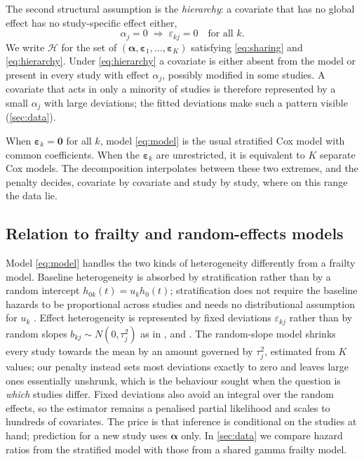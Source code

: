 \documentclass[11pt]{article}
\theoremstyle{remark}
\numberwithin{equation}{section}
\newcommand{\balpha}{\boldsymbol{\alpha}}
\newcommand{\beps}{\boldsymbol{\varepsilon}}
\newcommand{\Hset}{\mathcal{H}}
\begin{document}
The second structural assumption is the \emph{hierarchy}: a covariate that has no
global effect has no study-specific effect either,
\begin{equation}
  \alpha_j = 0 \;\Longrightarrow\; \varepsilon_{kj}=0 \quad\text{for all } k.
  \label{eq:hierarchy}
\end{equation}
We write $\Hset$ for the set of $(\balpha,\beps_1,\dots,\beps_K)$ satisfying
\eqref{eq:sharing} and \eqref{eq:hierarchy}. Under \eqref{eq:hierarchy} a
covariate is either absent from the model or present in every study with effect
$\alpha_j$, possibly modified in some studies. A covariate that acts in only a
minority of studies is therefore represented by a small $\alpha_j$ with large
deviations; the fitted deviations make such a pattern visible
(\cref{sec:data}).

When $\beps_k=\mathbf{0}$ for all $k$, model \eqref{eq:model} is the usual
stratified Cox model with common coefficients. When the $\beps_k$ are unrestricted,
it is equivalent to $K$ separate Cox models. The decomposition interpolates
between these two extremes, and the penalty decides, covariate by covariate and
study by study, where on this range the data lie.

\subsection{Relation to frailty and random-effects models}
\label{subsec:frailty}

Model \eqref{eq:model} handles the two kinds of heterogeneity differently from a
frailty model. Baseline heterogeneity is absorbed by stratification rather than
by a random intercept $h_{0k}(t)=u_k h_0(t)$; stratification does not require
the baseline hazards to be proportional across studies and needs no
distributional assumption for $u_k$ \citep{Therneau2000}. Effect heterogeneity is
represented by fixed deviations $\varepsilon_{kj}$ rather than by random slopes
$b_{kj}\sim N(0,\tau_j^2)$ as in \citet{VaidaXu2000}, \citet{RipattiPalmgren2000}
and \citet{Groll2017}. The random-slope model shrinks every study towards the
mean by an amount governed by $\tau_j^2$, estimated from $K$ values; our penalty
instead sets most deviations exactly to zero and leaves large ones essentially
unshrunk, which is the behaviour sought when the question is \emph{which} studies
differ. Fixed deviations also avoid an integral over the random effects, so the
estimator remains a penalised partial likelihood and scales to hundreds of
covariates. The price is that inference is conditional on the studies at hand;
prediction for a new study uses $\balpha$ only. In \cref{sec:data} we compare
hazard ratios from the stratified model with those from a shared gamma frailty
model.
\end{document}
